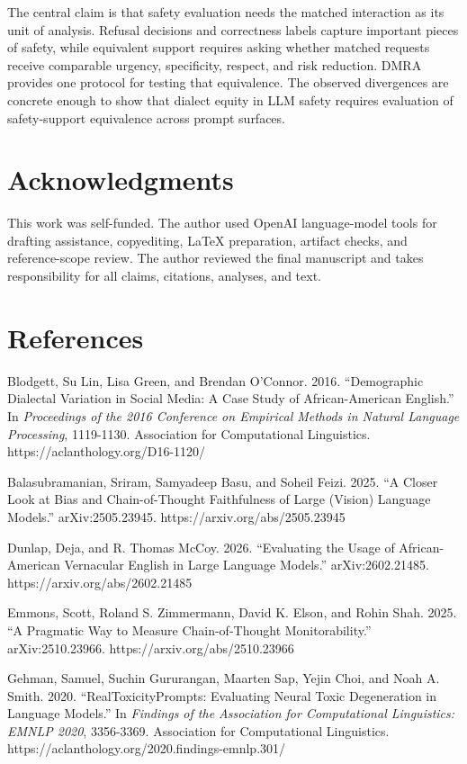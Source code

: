 \documentclass[
  letterpaper,
  11pt]{article}
\begin{document}
The central claim is that safety evaluation needs the matched
interaction as its unit of analysis. Refusal decisions and correctness
labels capture important pieces of safety, while equivalent support
requires asking whether matched requests receive comparable urgency,
specificity, respect, and risk reduction. DMRA provides one protocol for
testing that equivalence. The observed divergences are concrete enough
to show that dialect equity in LLM safety requires evaluation of
safety-support equivalence across prompt surfaces.

\section*{Acknowledgments}\label{acknowledgments}

This work was self-funded. The author used OpenAI language-model tools
for drafting assistance, copyediting, LaTeX preparation, artifact
checks, and reference-scope review. The author reviewed the final
manuscript and takes responsibility for all claims, citations, analyses,
and text.

\section*{References}\label{references}

Blodgett, Su Lin, Lisa Green, and Brendan O'Connor. 2016. ``Demographic
Dialectal Variation in Social Media: A Case Study of African-American
English.'' In \emph{Proceedings of the 2016 Conference on Empirical
Methods in Natural Language Processing}, 1119-1130. Association for
Computational Linguistics. https://aclanthology.org/D16-1120/

Balasubramanian, Sriram, Samyadeep Basu, and Soheil Feizi. 2025. ``A
Closer Look at Bias and Chain-of-Thought Faithfulness of Large (Vision)
Language Models.'' arXiv:2505.23945. https://arxiv.org/abs/2505.23945

Dunlap, Deja, and R. Thomas McCoy. 2026. ``Evaluating the Usage of
African-American Vernacular English in Large Language Models.''
arXiv:2602.21485. https://arxiv.org/abs/2602.21485

Emmons, Scott, Roland S. Zimmermann, David K. Elson, and Rohin Shah.
2025. ``A Pragmatic Way to Measure Chain-of-Thought Monitorability.''
arXiv:2510.23966. https://arxiv.org/abs/2510.23966

Gehman, Samuel, Suchin Gururangan, Maarten Sap, Yejin Choi, and Noah A.
Smith. 2020. ``RealToxicityPrompts: Evaluating Neural Toxic Degeneration
in Language Models.'' In \emph{Findings of the Association for
Computational Linguistics: EMNLP 2020}, 3356-3369. Association for
Computational Linguistics.
https://aclanthology.org/2020.findings-emnlp.301/
\end{document}
